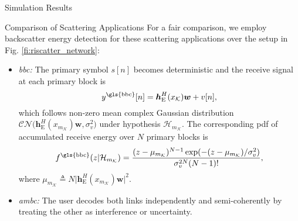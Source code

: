 \documentclass[journal]{IEEEtran}
\begin{document}
\begin{section}{Simulation Results}
	\begin{subsection}{Comparison of Scattering Applications}
		For a fair comparison, we employ backscatter energy detection for these scattering applications over the setup in Fig. \ref{fi:riscatter_network}:
		\begin{itemize}
			\item \emph{\gls{bbc}:}
			The primary symbol $s[n]$ becomes deterministic and the receive signal at each primary block is
			\begin{equation}
				y^{\text{\gls{bbc}}}[n] = \boldsymbol{h}_{\mathrm{E}}^H(x_{\mathcal{K}}) \boldsymbol{w} + v[n],
			\end{equation}
			which follows non-zero mean complex Gaussian distribution $\mathcal{CN}\bigl(\boldsymbol{h}_{\mathrm{E}}^H(x_{m_{\mathcal{K}}}) \boldsymbol{w},\sigma_v^2\bigr)$ under hypothesis $\mathcal{H}_{m_{\mathcal{K}}}$.
			The corresponding \gls{pdf} of accumulated receive energy over $N$ primary blocks is
			\begin{equation}
				f^{\text{\gls{bbc}}}(z|\mathcal{H}_{m_{\mathcal{K}}}) = \frac{(z-\mu_{m_{\mathcal{K}}})^{N-1} \exp(-(z-\mu_{m_{\mathcal{K}}})/\sigma_v^2)}{\sigma_v^{2N} (N-1)!},
			\end{equation}
			where $\mu_{m_{\mathcal{K}}} \triangleq N \lvert \boldsymbol{h}_{\mathrm{E}}^H(x_{m_{\mathcal{K}}}) \boldsymbol{w} \rvert^2$.
			\item \emph{\gls{ambc}:} The user decodes both links independently and semi-coherently by treating the other as interference or uncertainty.

\end{itemize}
\end{subsection}
\end{section}
\end{document}
